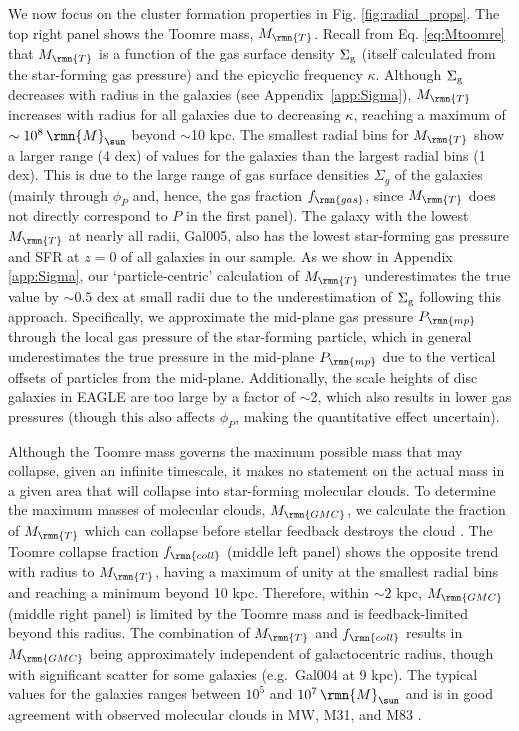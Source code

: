 \documentclass[fleqn,usenatbib]{mnras}
\newcommand\Msun{\,\rmn{M}_{\sun}}
\newcommand{\Mtoomre}{M_\rmn{T}}
\newcommand{\Mgmc}{M_\rmn{GMC}}
\begin{document}
We now focus on the cluster formation properties in Fig. \ref{fig:radial_props}.
The top right panel shows the Toomre mass, $\Mtoomre$. Recall from Eq. \ref{eq:Mtoomre} that $\Mtoomre$ is a function of the gas surface density $\Sigma_{\rm g}$ (itself calculated from the star-forming gas pressure) and the epicyclic frequency $\kappa$.
Although $\Sigma_{\rm g}$ decreases with radius in the galaxies (see Appendix~\ref{app:Sigma}), $\Mtoomre$ increases with radius for all galaxies due to decreasing $\kappa$, reaching a maximum of $\sim 10^8 \Msun$ beyond $\sim$10 kpc. The smallest radial bins for $\Mtoomre$ show a larger range (4 dex) of values for the galaxies than the largest radial bins (1 dex). This is due to the large range of gas surface densities $\Sigma_g$ of the galaxies (mainly through $\phi_P$ and, hence, the gas fraction $f_\rmn{gas}$, since $\Mtoomre$ does not directly correspond to $P$ in the first panel). The galaxy with the lowest $\Mtoomre$ at nearly all radii, Gal005, also has the lowest star-forming gas pressure and SFR at $z=0$ of all galaxies in our sample. 
As we show in Appendix \ref{app:Sigma}, our `particle-centric' calculation of $\Mtoomre$ underestimates the true value by $\sim0.5$ dex at small radii due to the underestimation of $\Sigma_{\rm g}$ following this approach. Specifically, we approximate the mid-plane gas pressure $P_\rmn{mp}$ through the local gas pressure of the star-forming particle, which in general underestimates the true pressure in the mid-plane $P_\rmn{mp}$ due to the vertical offsets of particles from the mid-plane. Additionally, the scale heights of disc galaxies in EAGLE are too large by a factor of $\sim$2, which also results in lower gas pressures (though this also affects $\phi_P$, making the quantitative effect uncertain).

Although the Toomre mass governs the maximum possible mass that may collapse, given an infinite timescale, it makes no statement on the actual mass in a given area that will collapse into star-forming molecular clouds.
To determine the maximum masses of molecular clouds, $\Mgmc$, we calculate the fraction of $\Mtoomre$ which can collapse before stellar feedback destroys the cloud \citep{Reina-Campos_and_Kruijssen_17}.
The Toomre collapse fraction $f_\rmn{coll}$ (middle left panel) shows the opposite trend with radius to $\Mtoomre$, having a maximum of unity at the smallest radial bins and reaching a minimum beyond 10 kpc. Therefore, within $\sim 2$ kpc, $\Mgmc$ (middle right panel) is limited by the Toomre mass and is feedback-limited beyond this radius. 
The combination of $\Mtoomre$ and $f_\rmn{coll}$ results in $\Mgmc$ being approximately independent of galactocentric radius, though with significant scatter for some galaxies (e.g.~Gal004 at 9 kpc). The typical values for the galaxies ranges between $10^5$ and $10^7 \Msun$ and is in good agreement with observed molecular clouds in MW, M31, and M83 \citep[$\sim10^4$-$10^7 \Msun$, shown as the grey shaded region;][Schruba et al.~in prep.]{Heyer_et_al_09, Freeman_et_al_17, Johnson_et_al_17}. 
\end{document}

